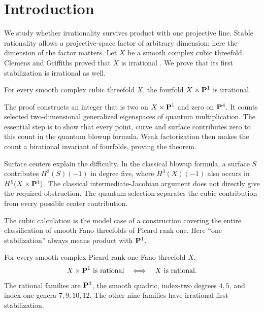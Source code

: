 \section{Introduction}

We study whether irrationality survives product with one projective line.
Stable rationality allows a projective-space factor of arbitrary dimension;
here the dimension of the factor matters. Let \(X\) be a smooth complex cubic
threefold. Clemens and Griffiths proved that \(X\) is irrational \cite{CG}.
We prove that its first stabilization is irrational as well.

\begin{theorem}
\label{thm:every-cubic}
%
%
For every smooth complex cubic threefold \(X\), the fourfold
\(X\times\mathbf P^1\) is irrational.
\end{theorem}

The proof constructs an integer that is two on $X\times\mathbf P^1$ and zero
on $\mathbf P^4$. It counts selected two-dimensional generalized eigenspaces
of quantum multiplication. The essential step is to show that every point,
curve and surface contributes zero to this count in the quantum blowup
formula. Weak factorization then makes the count a birational invariant
of fourfolds, proving the theorem.

Surface centers explain the difficulty. In the classical blowup formula,
a surface $S$ contributes $H^3(S)(-1)$ in degree five, where
$H^3(X)(-1)$ also occurs in $H^5(X\times\mathbf P^1)$. The classical
intermediate-Jacobian argument does not directly give the required
obstruction. The quantum selection separates the cubic
contribution from every possible center contribution.

The cubic calculation is the model case of a construction covering the
entire classification of smooth Fano threefolds of Picard rank one.
Here ``one stabilization'' always means product with $\mathbf P^1$.

\begin{theorem}
\label{thm:fano-one-step-classification}%
For every smooth complex Picard-rank-one Fano threefold $X$,
\[
 X\times\mathbf P^1\text{ is rational}\quad\Longleftrightarrow\quad
 X\text{ is rational}.
\]
The rational families are $\mathbf P^3$, the smooth quadric, index-two degrees
$4,5$, and index-one genera $7,9,10,12$. The other nine families have
irrational first stabilization.
\end{theorem}

